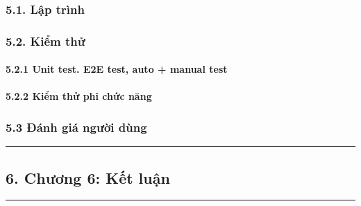 \hypertarget{lux1eadp-truxecnh}{%
  \subsubsection{\texorpdfstring{5.1. Lập trình
    }{5.1. Lập trình }}\label{lux1eadp-truxecnh}}

\hypertarget{kiux1ec3m-thux1eed}{%
  \subsubsection{\texorpdfstring{5.2. Kiểm thử
    }{5.2. Kiểm thử }}\label{kiux1ec3m-thux1eed}}

\hypertarget{unit-test.-e2e-test-auto-manual-test}{%
  \paragraph{\texorpdfstring{5.2.1 Unit test. E2E test, auto + manual test
    }{5.2.1 Unit test. E2E test, auto + manual test }}\label{unit-test.-e2e-test-auto-manual-test}}

\hypertarget{kiux1ec3m-thux1eed-phi-chux1ee9c-nux103ng}{%
  \paragraph{\texorpdfstring{5.2.2 Kiểm thử phi chức năng
    }{5.2.2 Kiểm thử phi chức năng }}\label{kiux1ec3m-thux1eed-phi-chux1ee9c-nux103ng}}

\hypertarget{ux111uxe1nh-giuxe1-ngux1b0ux1eddi-duxf9ng}{%
  \subsubsection{\texorpdfstring{5.3 Đánh giá người dùng
    }{5.3 Đánh giá người dùng }}\label{ux111uxe1nh-giuxe1-ngux1b0ux1eddi-duxf9ng}}

\begin{center}\rule{0.5\linewidth}{0.5pt}\end{center}

\hypertarget{chux1b0ux1a1ng-6-kux1ebft-luux1eadn}{%
  \subsection{\texorpdfstring{6. Chương 6: Kết luận
    }{6. Chương 6: Kết luận }}\label{chux1b0ux1a1ng-6-kux1ebft-luux1eadn}}

\begin{center}\rule{0.5\linewidth}{0.5pt}\end{center}

